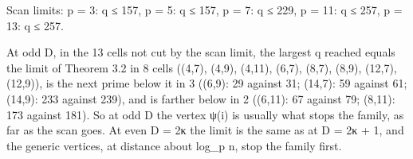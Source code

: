 \documentclass[
  10pt,
]{article}
\begin{document}
Scan limits: p = 3: q ≤ 157, p = 5: q ≤ 157, p = 7: q ≤ 229, p = 11: q ≤
257, p = 13: q ≤ 257.

At odd D, in the 13 cells not cut by the scan limit, the largest q
reached equals the limit of Theorem 3.2 in 8 cells ((4,7), (4,9),
(4,11), (6,7), (8,7), (8,9), (12,7), (12,9)), is the next prime below it
in 3 ((6,9): 29 against 31; (14,7): 59 against 61; (14,9): 233 against
239), and is farther below in 2 ((6,11): 67 against 79; (8,11): 173
against 181). So at odd D the vertex ψ(i) is usually what stops the
family, as far as the scan goes. At even D = 2κ the limit is the same as
at D = 2κ + 1, and the generic vertices, at distance about log\_p n,
stop the family first.
\end{document}
